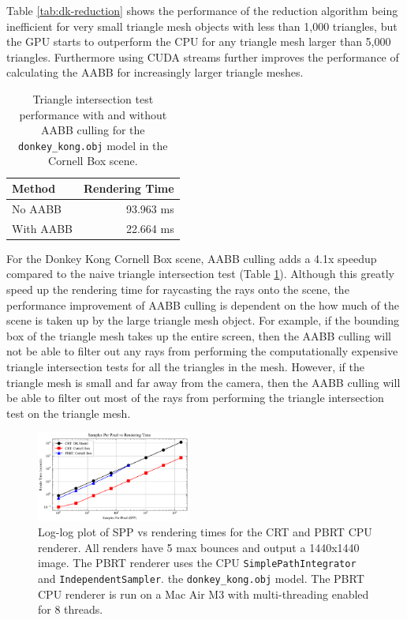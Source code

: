 \documentclass[../main.tex]{subfiles}
\begin{document}
Table \ref{tab:dk-reduction} shows the performance of the reduction algorithm
being inefficient for very small triangle mesh objects with less than 1,000
triangles, but the GPU starts to outperform the CPU for any triangle mesh larger
than 5,000 triangles. Furthermore using CUDA streams further improves the performance of
calculating the AABB for increasingly larger triangle meshes.
  
\begin{table}[h]
    \caption{Triangle intersection test performance with and without AABB culling for
    the \texttt{donkey\_kong.obj} model in the Cornell Box scene.}
    \label{tab:aabb-speedup}
    \centering
    \begin{tabular}{|l|r|}
      \hline
      \textbf{Method} & \textbf{Rendering Time} \\
      \hline
      No AABB & 93.963 ms \\
      \hline
      With AABB & 22.664 ms \\
      \hline
    \end{tabular}
\end{table}

For the Donkey Kong Cornell Box scene, AABB culling adds a 4.1x speedup compared to the naive
triangle intersection test (Table \ref{tab:aabb-speedup}). Although this greatly
speed up the rendering time for raycasting the rays onto the scene, the performance improvement 
of AABB culling is dependent on the how much of the scene is taken up by the large
triangle mesh object. For example, if the bounding box of the triangle mesh
takes up the entire screen, then the AABB culling will not be able to filter
out any rays from performing the computationally expensive triangle intersection tests for all
the triangles in the mesh. However, if the triangle mesh is small and far away
from the camera, then the AABB culling will be able to filter out most of the rays
from performing the triangle intersection test on the triangle mesh.

\begin{figure}[h]
    \centering
    \includegraphics[width=0.45\textwidth]{render_time_vs_spp.png}
    \caption{Log-log plot of SPP vs rendering times for the CRT and PBRT CPU renderer.
    All renders have 5 max bounces and output a 1440x1440 image. The PBRT renderer
    uses the CPU \texttt{SimplePathIntegrator} and \texttt{IndependentSampler}.
    the \texttt{donkey\_kong.obj} model. The PBRT CPU renderer is run on a
    Mac Air M3 with multi-threading enabled for 8 threads.}
    \label{fig:crt_pbrt}
\end{figure}
\end{document}
